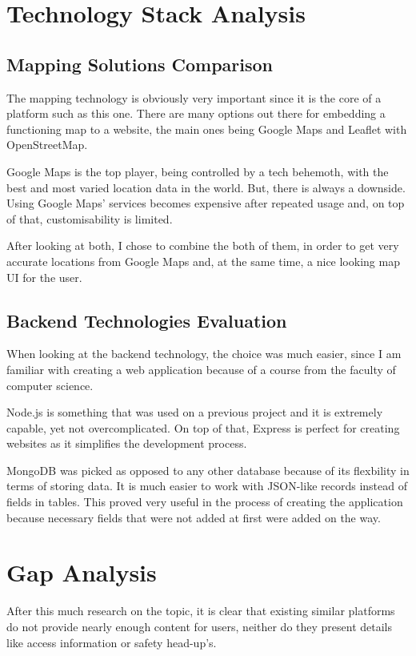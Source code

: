 \documentclass[12pt,a4paper]{report}
\begin{document}
\section{Technology Stack Analysis}
\subsection{Mapping Solutions Comparison}

The mapping technology is obviously very important since it is the core of a platform such as this one. There are many options out there for embedding a functioning map to a website, the main ones being Google Maps and Leaflet with OpenStreetMap.

Google Maps is the top player, being controlled by a tech behemoth, with the best and most varied location data in the world. But, there is always a downside. Using Google Maps' services becomes expensive after repeated usage and, on top of that, customisability is limited.

After looking at both, I chose to combine the both of them, in order to get very accurate locations from Google Maps and, at the same time, a nice looking map UI for the user.

\subsection{Backend Technologies Evaluation}
When looking at the backend technology, the choice was much easier, since I am familiar with creating a web application because of a course from the faculty of computer science. 

Node.js is something that was used on a previous project and it is extremely capable, yet not overcomplicated. On top of that, Express is perfect for creating websites as it simplifies the development process.

MongoDB was picked as opposed to any other database because of its flexbility in terms of storing data. It is much easier to work with JSON-like records instead of fields in tables. This proved very useful in the process of creating the application because necessary fields that were not added at first were added on the way.

\section{Gap Analysis}
After this much research on the topic, it is clear that existing similar platforms do not provide nearly enough content for users, neither do they present details like access information or safety head-up's. 
\end{document}
